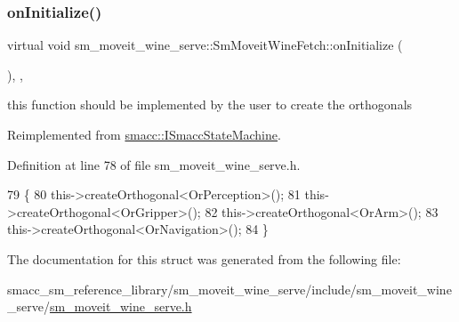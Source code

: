 \subsubsection{\texorpdfstring{on\+Initialize()}{onInitialize()}}
{\footnotesize\ttfamily virtual void sm\+\_\+moveit\+\_\+wine\+\_\+serve\+::\+Sm\+Moveit\+Wine\+Fetch\+::on\+Initialize (\begin{DoxyParamCaption}{ }\end{DoxyParamCaption})\hspace{0.3cm}{\ttfamily [inline]}, {\ttfamily [override]}, {\ttfamily [virtual]}}



this function should be implemented by the user to create the orthogonals 



Reimplemented from \hyperlink{classsmacc_1_1ISmaccStateMachine_ac2982c6c8283663e5e1e8a7c82f511ec}{smacc\+::\+I\+Smacc\+State\+Machine}.



Definition at line 78 of file sm\+\_\+moveit\+\_\+wine\+\_\+serve.\+h.


\begin{DoxyCode}
79         \{
80             this->createOrthogonal<OrPerception>();
81             this->createOrthogonal<OrGripper>();
82             this->createOrthogonal<OrArm>();
83             this->createOrthogonal<OrNavigation>();
84         \}
\end{DoxyCode}


The documentation for this struct was generated from the following file\+:\begin{DoxyCompactItemize}
\item 
smacc\+\_\+sm\+\_\+reference\+\_\+library/sm\+\_\+moveit\+\_\+wine\+\_\+serve/include/sm\+\_\+moveit\+\_\+wine\+\_\+serve/\hyperlink{sm__moveit__wine__serve_8h}{sm\+\_\+moveit\+\_\+wine\+\_\+serve.\+h}\end{DoxyCompactItemize}
